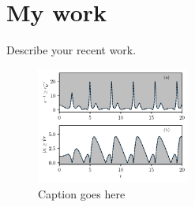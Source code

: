 \documentclass{article}
\begin{document}
	\def\xlist{4}
	\def\ylist{4}
\section*{My work}

Describe your recent work.

\begin{figure}[h!]
	\centering
	\hspace*{-0.75cm}\includegraphics[width=0.45\textwidth]{sample-plot.pdf}
	\caption{Caption goes here}
	\label{fig:plot-label}
\end{figure}
\end{document}
